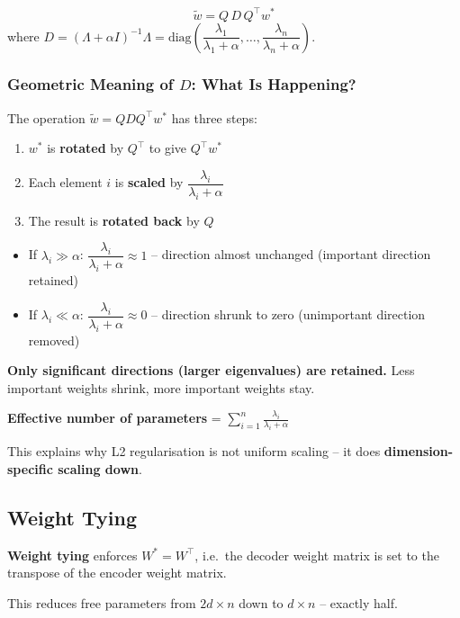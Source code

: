 \documentclass[12pt,a4paper]{article}
\begin{document}
\[
\boxed{\tilde{w} = Q\,D\,Q^\top w^*}
\]
where $D = (\Lambda + \alpha I)^{-1}\Lambda = \mathrm{diag}\!\left(\dfrac{\lambda_1}{\lambda_1+\alpha},\ldots,\dfrac{\lambda_n}{\lambda_n+\alpha}\right)$.

\subsubsection{Geometric Meaning of $D$: What Is Happening?}

The operation $\tilde{w} = QDQ^\top w^*$ has three steps:
\begin{enumerate}
  \item $w^*$ is \textbf{rotated} by $Q^\top$ to give $Q^\top w^*$
  \item Each element $i$ is \textbf{scaled} by $\dfrac{\lambda_i}{\lambda_i + \alpha}$
  \item The result is \textbf{rotated back} by $Q$
\end{enumerate}

\begin{itemize}
  \item If $\lambda_i \gg \alpha$: $\dfrac{\lambda_i}{\lambda_i+\alpha} \approx 1$ -- direction almost unchanged (important direction retained)
  \item If $\lambda_i \ll \alpha$: $\dfrac{\lambda_i}{\lambda_i+\alpha} \approx 0$ -- direction shrunk to zero (unimportant direction removed)
\end{itemize}

\begin{keybox}
\textbf{Only significant directions (larger eigenvalues) are retained.} Less important weights shrink, more important weights stay.

\textbf{Effective number of parameters} = $\displaystyle\sum_{i=1}^{n}\frac{\lambda_i}{\lambda_i + \alpha}$

This explains why L2 regularisation is not uniform scaling -- it does \textbf{dimension-specific scaling down}.
\end{keybox}

\subsection{Weight Tying}

\begin{defbox}
\textbf{Weight tying} enforces $W^* = W^\top$, i.e.\ the decoder weight matrix is set to the transpose of the encoder weight matrix.

This reduces free parameters from $2d\times n$ down to $d\times n$ -- exactly half.
\end{defbox}
\end{document}
